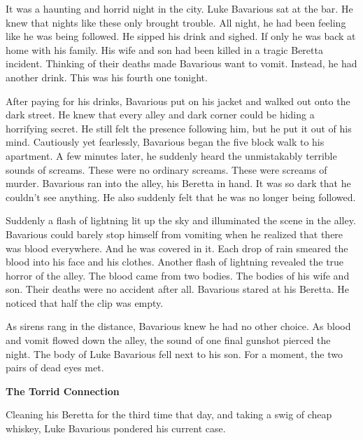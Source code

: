 It was a haunting and horrid night in the city. Luke Bavarious sat
at the bar. He knew that nights like these only brought trouble.
All night, he had been feeling like he was being followed. He
sipped his drink and sighed. If only he was back at home with his
family. His wife and son had been killed in a tragic Beretta
incident. Thinking of their deaths made Bavarious want to vomit.
Instead, he had another drink. This was his fourth one
tonight.



After paying for his drinks, Bavarious put on his jacket and walked
out onto the dark street. He knew that every alley and dark corner
could be hiding a horrifying secret. He still felt the presence
following him, but he put it out of his mind. Cautiously yet
fearlessly, Bavarious began the five block walk to his apartment. A
few minutes later, he suddenly heard the unmistakably terrible
sounds of screams. These were no ordinary screams. These were
screams of murder. Bavarious ran into the alley, his Beretta in
hand. It was so dark that he couldn't see anything. He also
suddenly felt that he was no longer being followed.



Suddenly a flash of lightning lit up the sky and illuminated the
scene in the alley. Bavarious could barely stop himself from
vomiting when he realized that there was blood everywhere. And he
was covered in it. Each drop of rain smeared the blood into his
face and his clothes. Another flash of lightning revealed the true
horror of the alley. The blood came from two bodies. The bodies of
his wife and son. Their deaths were no accident after all.
Bavarious stared at his Beretta. He noticed that half the clip was
empty.



As sirens rang in the distance, Bavarious knew he had no other
choice. As blood and vomit flowed down the alley, the sound of one
final gunshot pierced the night. The body of Luke Bavarious fell
next to his son. For a moment, the two pairs of dead eyes met. 

 





{\bf The Torrid Connection}



Cleaning his Beretta for the third time that day, and taking a swig
of cheap whiskey, Luke Bavarious pondered his current case.



